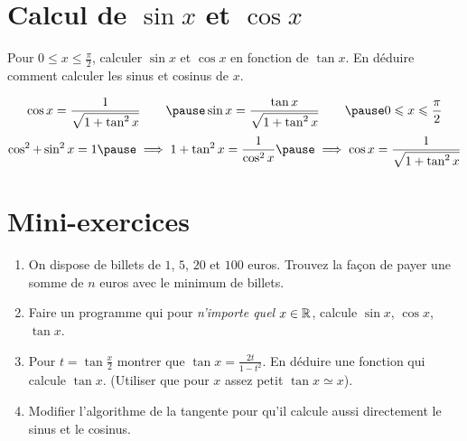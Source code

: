 \section{Calcul de $\sin x$ et $\cos x$}


\begin{frame}


\begin{tp}
Pour $0 \le x \le \frac \pi2$, calculer $\sin x$ et $\cos x$ en fonction de $\tan x$.
En déduire comment calculer les sinus et cosinus de $x$.
\end{tp}

\pause
\bigskip

$$\cos x = \frac{1}{\sqrt{1+\tan^2 x}} \qquad
\pause \sin x = \frac{\tan x}{\sqrt{1+\tan^2 x}} \qquad
\pause 0 \le x \le \frac \pi2$$
\pause
$$\cos^2+\sin^2 x = 1 
\pause \implies 1+\tan^2 x = \frac{1}{\cos^2 x}
\pause \implies \cos x = \frac{1}{\sqrt{1+\tan^2 x}} $$

\end{frame}




\section{Mini-exercices}

\begin{frame}

\begin{miniexercice}
\begin{enumerate}
 
  \item On dispose de billets de $1$, $5$, $20$ et $100$ euros. Trouvez la façon de payer une somme de
  $n$ euros avec le minimum de billets.
 
  \item Faire un programme qui pour \emph{n'importe quel} $x \in \mathbb{R}$, calcule $\sin x$, $\cos x$, $\tan x$. 
  
  \item Pour $t = \tan \frac x2$ montrer que $\tan x = \frac{2t}{1-t^2}$. 
  En déduire une fonction qui calcule $\tan x$. (Utiliser que pour $x$ assez petit $\tan x \simeq x$).
  
  \item Modifier l'algorithme de la tangente pour qu'il calcule aussi directement
  le sinus et le cosinus.

\end{enumerate}

\end{miniexercice}

\end{frame}

